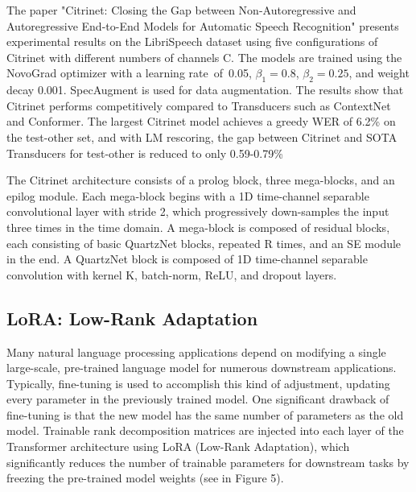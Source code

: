 \documentclass[conference]{IEEEtran}
\begin{document}
The paper "Citrinet: Closing the Gap between Non-Autoregressive and Autoregressive End-to-End Models for Automatic Speech Recognition" presents experimental results on the LibriSpeech dataset using five configurations of Citrinet with different numbers of channels C. The models are trained using the NovoGrad optimizer with a learning rate of 0.05, $\beta_1 = 0.8$, $\beta_2 = 0.25$, and weight decay 0.001. SpecAugment is used for data augmentation. The results show that Citrinet performs competitively compared to Transducers such as ContextNet and Conformer. The largest Citrinet model achieves a greedy WER of 6.2\% on the test-other set, and with LM rescoring, the gap between Citrinet and SOTA Transducers for test-other is reduced to only 0.59-0.79\%

The Citrinet architecture consists of a prolog block, three mega-blocks, and an epilog module. Each mega-block begins with a 1D time-channel separable convolutional layer with stride 2, which progressively down-samples the input three times in the time domain. A mega-block is composed of residual blocks, each consisting of basic QuartzNet blocks, repeated R times, and an SE module in the end. A QuartzNet block is composed of 1D time-channel separable convolution with kernel K, batch-norm, ReLU, and dropout layers.

\subsection{LoRA: Low-Rank Adaptation}

\quad \quad Many natural language processing applications depend on modifying a single large-scale, pre-trained language model for numerous downstream applications. Typically, fine-tuning is used to accomplish this kind of adjustment, updating every parameter in the previously trained model. One significant drawback of fine-tuning is that the new model has the same number of parameters as the old model. Trainable rank decomposition matrices are injected into each layer of the Transformer architecture using LoRA (Low-Rank Adaptation), which significantly reduces the number of trainable parameters for downstream tasks by freezing the pre-trained model weights (see in Figure 5).
\end{document}
